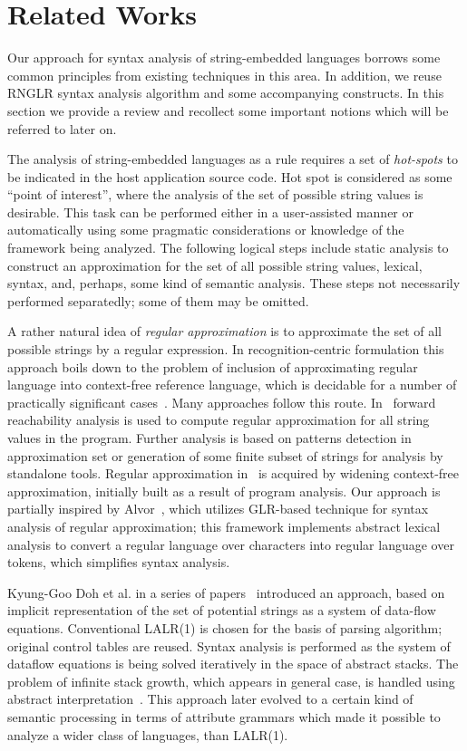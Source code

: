 \section{Related Works}

Our approach for syntax analysis of string-embedded languages borrows some common principles
from existing techniques in this area. In addition, we reuse RNGLR syntax analysis algorithm 
and some accompanying constructs. In this section we provide a review and recollect some important
notions which will be referred to later on. 

The analysis of string-embedded languages as a rule requires a set of \emph{hot-spots} to
be indicated in the host application source code. Hot spot is considered as some ``point 
of interest'', where the analysis of the set of possible string values is desirable. This task can be
performed either in a user-assisted manner or automatically using some pragmatic 
considerations or knowledge of the framework being analyzed. The following logical steps 
include static analysis to construct an approximation for the set of all possible string values,
lexical, syntax, and, perhaps, some kind of semantic analysis. These steps not
necessarily performed separatedly; some of them may be omitted.

A rather natural idea of \emph{regular approximation} is to approximate the set of all possible 
strings by a regular expression. In recognition-centric formulation this approach boils down to
the problem of inclusion of approximating regular language into context-free reference language, which
is decidable for a number of practically significant cases~\cite{LangInclusion}.
Many approaches follow this route. In~\cite{Stranger} forward reachability analysis is used to compute regular 
approximation for all string values in the program. Further analysis is based on patterns detection in approximation 
set or generation of some finite subset of strings for analysis by standalone tools. Regular approximation in~\cite{JSA} 
is acquired by widening context-free approximation, initially built as a result of program analysis. 
Our approach is partially inspired by Alvor~\cite{Alvor,ALVOR2}, which utilizes GLR-based technique for syntax 
analysis of regular approximation; this framework implements abstract lexical analysis to convert a
regular language over characters into regular language over tokens, which simplifies syntax analysis.

Kyung-Goo Doh et al. in a series of papers~\cite{AbstrParsing,LRAbstrParsing,LRAbstrParsingSema} introduced an
approach, based on implicit representation of the set of potential strings as a system of data-flow equations. 
Conventional LALR(1) is chosen for the basis of parsing algorithm; original control tables are reused. 
Syntax analysis is performed as the system of dataflow equations is being solved iteratively in the space of abstract stacks.
The problem of infinite stack growth, which appears in general case, is handled using abstract 
interpretation~\cite{AbstractInterpretation}. This approach later evolved to a certain kind of semantic processing
in terms of attribute grammars which made it possible to analyze a wider class of languages, than
LALR(1).

